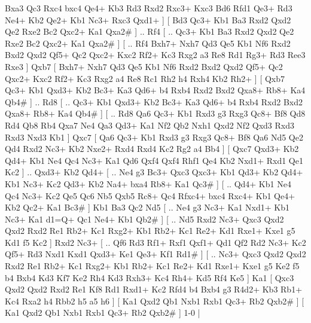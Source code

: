 Bxa3  Qc3 Rxc4  bxc4 Qe4+  Kb3 Rd3  Rxd2 Rxc3+  Kxc3 Bd6  Rfd1 Qe3+  Rd3 Ne4+  Kb2 Qe2+  Kb1 Nc3+  Rxc3 Qxd1+   ]  [  Bd3 Qc3+  Kb1 Ba3  Rxd2 Qxd2  Qe2 Rxe2  Bc2 Qxc2+  Ka1 Qxa2#   ] .. Rf4 [ .. Qc3+  Kb1 Ba3  Rxd2 Qxd2  Qe2 Rxe2  Bc2 Qxc2+  Ka1 Qxa2#   ]  [ .. Rf4  Bxh7+ Nxh7  Qd3 Qe5  Kb1 Nf6  Rxd2 Bxd2  Qxd2 Qf5+  Qc2 Qxc2+  Kxc2 Rf2+  Kc3 Rxg2  a3 Re8  Rd1 Rg3+  Rd3 Ree3  Rxe3   ]  Qxb7 [  Bxh7+ Nxh7  Qd3 Qe5  Kb1 Nf6  Rxd2 Bxd2  Qxd2 Qf5+  Qc2 Qxc2+  Kxc2 Rf2+  Kc3 Rxg2  a4 Re8  Rc1 Rh2  h4 Rxh4  Kb2 Rh2+   ]  [  Qxb7 Qc3+  Kb1 Qxd3+  Kb2 Bc3+  Ka3 Qd6+  b4 Rxb4  Rxd2 Bxd2  Qxa8+ Rb8+  Ka4 Qb4#   ] .. Rd8 [ .. Qc3+  Kb1 Qxd3+  Kb2 Bc3+  Ka3 Qd6+  b4 Rxb4  Rxd2 Bxd2  Qxa8+ Rb8+  Ka4 Qb4#   ]  [ .. Rd8  Qa6 Qc3+  Kb1 Rxd3  g3 Rxg3  Qc8+ Bf8  Qd8 Rd4  Qb8 Rb4  Qxa7 Ne4  Qa3 Qd3+  Ka1 Nf2  Qb2 Nxh1  Qxd2 Nf2  Qxd3 Rxd3  Rxd3 Nxd3  Kb1   ]  Qxc7 [  Qa6 Qc3+  Kb1 Rxd3  g3 Rxg3  Qc8+ Bf8  Qa6 Nd5  Qe2 Qd4  Rxd2 Nc3+  Kb2 Nxe2+  Rxd4 Rxd4  Kc2 Rg2  a4 Bb4   ]  [  Qxc7 Qxd3+  Kb2 Qd4+  Kb1 Ne4  Qc4 Nc3+  Ka1 Qd6  Qxf4 Qxf4  Rhf1 Qe4  Kb2 Nxd1+  Rxd1 Qe1  Kc2   ] .. Qxd3+    Kb2  Qd4+ [ .. Ne4  g3 Bc3+  Qxc3 Qxc3+  Kb1 Qd3+  Kb2 Qd4+  Kb1 Nc3+  Kc2 Qd3+  Kb2 Na4+  bxa4 Rb8+  Ka1 Qc3#   ]  [ .. Qd4+  Kb1 Ne4  Qc4 Nc3+  Kc2 Qe5  Qc6 Nb5  Qxb5 Rc8+  Qc4 Rfxc4+  bxc4 Rxc4+  Kb1 Qe4+  Kb2 Qc2+  Ka1 Bc3#   ]  Kb1   Ba3    Qc2   Nd5 [ .. Ne4  g3 Nc3+  Ka1 Nxd1+  Kb1 Nc3+  Ka1 d1=Q+  Qc1 Ne4+  Kb1 Qb2#   ]  [ .. Nd5  Rxd2 Nc3+  Qxc3 Qxd2  Qxd2 Rxd2  Re1 Rb2+  Kc1 Rxg2+  Kb1 Rb2+  Kc1 Re2+  Kd1 Rxe1+  Kxe1 g5  Kd1 f5  Kc2   ]  Rxd2   Nc3+ [ .. Qf6  Rd3 Rf1+  Rxf1 Qxf1+  Qd1 Qf2  Rd2 Nc3+  Kc2 Qf5+  Rd3 Nxd1  Kxd1 Qxd3+  Ke1 Qe3+  Kf1 Rd1#   ]  [ .. Nc3+  Qxc3 Qxd2  Qxd2 Rxd2  Re1 Rb2+  Kc1 Rxg2+  Kb1 Rb2+  Kc1 Re2+  Kd1 Rxe1+  Kxe1 g5  Ke2 f5  b4 Bxb4  Kd3 Kf7  Ke2 Rh4  Kd3 Rxh3+  Kc4 Rh4+  Kd5 Rf4  Ke5   ]  Ka1 [  Qxc3 Qxd2  Qxd2 Rxd2  Re1 Kf8  Rd1 Rxd1+  Kc2 Rfd4  b4 Bxb4  g3 R4d2+  Kb3 Rb1+  Kc4 Rxa2  h4 Rbb2  h5 a5  h6   ]  [  Ka1 Qxd2  Qb1 Nxb1  Rxb1 Qc3+  Rb2 Qxb2#   ]  [  Ka1 Qxd2  Qb1 Nxb1  Rxb1 Qc3+  Rb2 Qxb2#   ] 1-0  |
